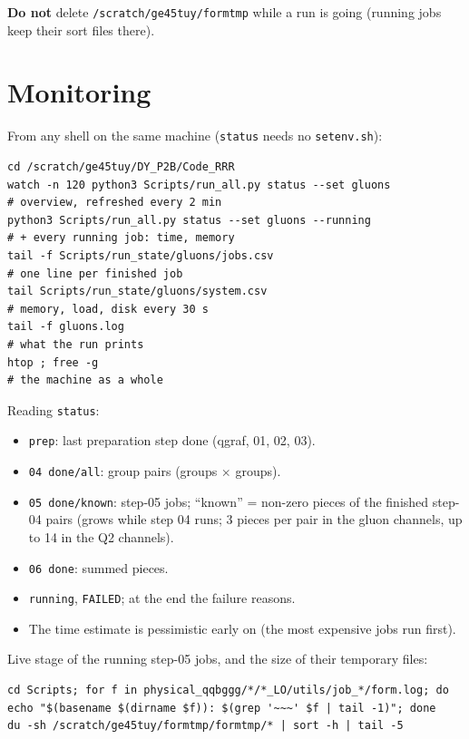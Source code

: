 \documentclass[10pt]{article}
\newcommand{\cmd}[1]{\texttt{#1}}
\begin{document}
\textbf{Do not} delete \cmd{/scratch/ge45tuy/formtmp} while a run is going (running jobs keep their sort files there).

\section{Monitoring}
From any shell on the same machine (\cmd{status} needs no \cmd{setenv.sh}):
\begin{lstlisting}
cd /scratch/ge45tuy/DY_P2B/Code_RRR
watch -n 120 python3 Scripts/run_all.py status --set gluons           # overview, refreshed every 2 min
python3 Scripts/run_all.py status --set gluons --running              # + every running job: time, memory
tail -f Scripts/run_state/gluons/jobs.csv                             # one line per finished job
tail Scripts/run_state/gluons/system.csv                              # memory, load, disk every 30 s
tail -f gluons.log                                                    # what the run prints
htop ; free -g                                                        # the machine as a whole
\end{lstlisting}
Reading \cmd{status}:
\begin{itemize}
\item \cmd{prep}: last preparation step done (qgraf, 01, 02, 03).
\item \cmd{04 done/all}: group pairs (groups $\times$ groups).
\item \cmd{05 done/known}: step-05 jobs; ``known'' = non-zero pieces of the finished step-04 pairs (grows while step 04 runs;
  3 pieces per pair in the gluon channels, up to 14 in the Q2 channels).
\item \cmd{06 done}: summed pieces.
\item \cmd{running}, \cmd{FAILED}; at the end the failure reasons.
\item The time estimate is pessimistic early on (the most expensive jobs run first).
\end{itemize}
Live stage of the running step-05 jobs, and the size of their temporary files:
\begin{lstlisting}
cd Scripts; for f in physical_qqbggg/*/*_LO/utils/job_*/form.log; do echo "$(basename $(dirname $f)): $(grep '~~~' $f | tail -1)"; done
du -sh /scratch/ge45tuy/formtmp/formtmp/* | sort -h | tail -5
\end{lstlisting}
\end{document}
